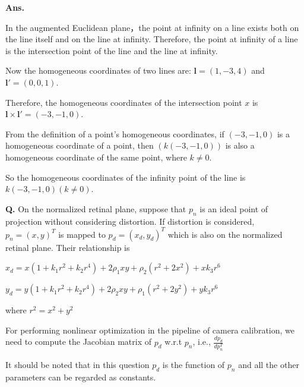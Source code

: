 \documentclass[12pt, a4paper, UTF8, fontset=windows]{ctexbook}
\newcounter{problemname}
\newenvironment{problem}{\begin{shaded}\stepcounter{problemname}\par\noindent\textbf{Q\arabic{problemname}.}}{\end{shaded}\par}
\newenvironment{solution}{\par\noindent\textbf{Ans.}}{\par}
\begin{document}
\begin{solution}
    
    In the augmented Euclidean plane，the point at infinity on a line exists both on the line itself and on the line at infinity. Therefore, the point at infinity of a line is the intersection point of the line and the line at infinity.
    
    Now the homogeneous coordinates of two lines are: $\mathbf{l}=(1, -3, 4)$ and $\mathbf{l'}=(0, 0, 1)$.

    Therefore, the homogeneous coordinates of the intersection point $x$ is $\mathbf{l} \times \mathbf{l'} = (-3, -1, 0)$.

    From the definition of a point's homogeneous coordinates, if $(-3, -1, 0)$ is a homogeneous coordinate of a point, 
    then $(k(-3, -1, 0))$ is also a homogeneous coordinate of the same point, where $k \neq 0$.

    So the homogeneous coordinates of the infinity point of the line is $k(-3, -1, 0)(k \neq 0)$.
\end{solution}


\begin{problem}
    On the normalized retinal plane, suppose that $p_n$ is an ideal point of projection without considering
    distortion. If distortion is considered, $p_n=(x, y)^T$ is mapped to $p_d=(x_d, y_d)^T$ which is also on the normalized
    retinal plane. Their relationship is
    
    $x_d = x(1 + k_1r^2 + k_2r^4) + 2 \rho_1 xy + \rho_2(r^2 + 2x^2) + xk_3r^6$
    
    $y_d = y(1 + k_1r^2 + k_2r^4) + 2 \rho_2 xy + \rho_1(r^2 + 2y^2) + yk_3r^6$

    where $r^2 = x^2 + y^2$

    For performing nonlinear optimization in the pipeline of camera calibration, we need to compute the Jacobian
    matrix of $p_d$ w.r.t $p_n$, i.e., $\frac{dp_d}{dp_n^T}$

    It should be noted that in this question $p_d$ is the function of $p_n$ and all the other parameters can be regarded as
    constants.
\end{problem}
\end{document}
